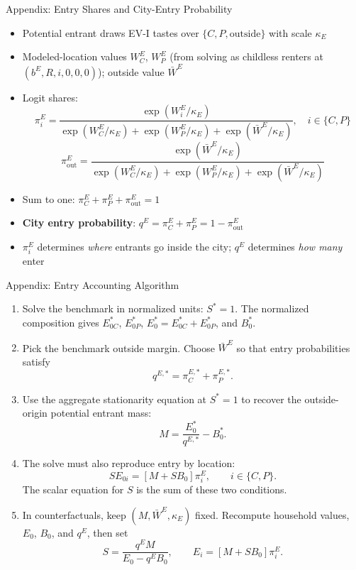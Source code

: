 \documentclass[11pt,aspectratio=169]{beamer}
\begin{document}
\begin{frame}[t]{Appendix: Entry Shares and City-Entry Probability \; \hyperlink{slide:entry_stationarity}{}}
\label{app:entry_shares_probs}
\footnotesize
\setlength{\abovedisplayskip}{3pt}\setlength{\belowdisplayskip}{3pt}

\begin{itemize}\setlength\itemsep{4pt}
  \item Potential entrant draws EV-I tastes over $\{C, P, \text{outside}\}$ with scale $\kappa_E$
  \item Modeled-location values $W_C^E$, $W_P^E$ (from solving as childless renters at $(b^E, R, i, 0, 0, 0)$); outside value $\bar W^E$
  \item Logit shares:
  \[
  \pi_i^E=\frac{\exp(W_i^E/\kappa_E)}{\exp(W_C^E/\kappa_E)+\exp(W_P^E/\kappa_E)+\exp(\bar W^E/\kappa_E)},
  \quad i\in\{C,P\}
  \]
  \[
  \pi_{\mathrm{out}}^E=\frac{\exp(\bar W^E/\kappa_E)}{\exp(W_C^E/\kappa_E)+\exp(W_P^E/\kappa_E)+\exp(\bar W^E/\kappa_E)}
  \]
  \item Sum to one: $\pi_C^E+\pi_P^E+\pi_{\mathrm{out}}^E=1$
  \item \textbf{City entry probability}: $q^E=\pi_C^E+\pi_P^E=1-\pi_{\mathrm{out}}^E$
  \item $\pi_i^E$ determines \emph{where} entrants go inside the city; $q^E$ determines \emph{how many} enter
\end{itemize}
\end{frame}

\begin{frame}[t]{Appendix: Entry Accounting Algorithm \; \hyperlink{slide:entry_stationarity}{}}
\label{app:entry_accounting}
\scriptsize
\setlength{\abovedisplayskip}{3pt}\setlength{\belowdisplayskip}{3pt}
\begin{enumerate}\setlength\itemsep{4pt}
  \item Solve the benchmark in normalized units: $S^*=1$. The normalized
  composition gives $E_{0C}^*$, $E_{0P}^*$, $E_0^*=E_{0C}^*+E_{0P}^*$, and $B_0^*$.

  \item Pick the benchmark outside margin. Choose $\bar W^E$ so that entry
  probabilities satisfy
  \[
  q^{E,*}=\pi_C^{E,*}+\pi_P^{E,*}.
  \]

  \item Use the aggregate stationarity equation at $S^*=1$ to recover the
  outside-origin potential entrant mass:
  \[
  M=\frac{E_0^*}{q^{E,*}}-B_0^*.
  \]

  \item The solve must also reproduce entry by location:
  \[
  S E_{0i}=\left[M+S B_0\right]\pi_i^E,\qquad i\in\{C,P\}.
  \]
  The scalar equation for $S$ is the sum of these two conditions.

  \item In counterfactuals, keep $(M,\bar W^E,\kappa_E)$ fixed. Recompute
  household values, $E_0$, $B_0$, and $q^E$, then set
  \[
  S=\frac{q^E M}{E_0-q^E B_0},
  \qquad
  E_i=\left[M+S B_0\right]\pi_i^E.
  \]
\end{enumerate}
\end{frame}
\end{document}
